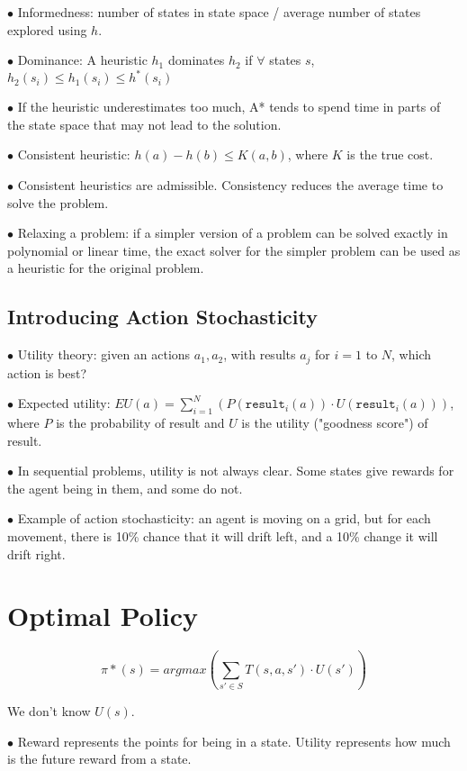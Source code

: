 \documentclass[english,openany]{book}
\begin{document}
    $\bullet$ Informedness: number of states in state space / average number of states explored using $h$.

    $\bullet$ Dominance: A heuristic $h_1$ dominates $h_2$ if $\forall$ states $s$, $h_2 (s_i) \leq h_1(s_i) \leq h^*(s_i)$

    $\bullet$ If the heuristic underestimates too much, A* tends to spend time in parts of the state space that may not lead to the solution.

    $\bullet$ Consistent heuristic: $h(a) - h(b) \leq K(a,b)$, where $K$ is the true cost.

    $\bullet$ Consistent heuristics are admissible. Consistency reduces the average time to solve the problem.

    $\bullet$ Relaxing a problem: if a simpler version of a problem can be solved exactly in polynomial or linear time, the exact solver for the simpler problem can be used as a heuristic for the original problem.

    \subsection{Introducing Action Stochasticity}

    $\bullet$ Utility theory: given an actions $a_1, a_2$, with results $a_j$ for $i = 1$ to $N$, which action is best?

    $\bullet$ Expected utility: $EU(a) = \sum_{i=1}^{N} (P(\texttt{result}_i (a)) \cdot U(\texttt{result}_i (a)))$, where $P$ is the probability of result and $U$ is the utility ("goodness score") of result.

    $\bullet$ In sequential problems, utility is not always clear. Some states give rewards for the agent being in them, and some do not.

    $\bullet$ Example of action stochasticity: an agent is moving on a grid, but for each movement, there is 10\% chance that it will drift left, and a 10\% change it will drift right.


    \section{Optimal Policy}

    $$\pi*(s) = argmax(\sum_{s' \in S} T(s, a, s') \cdot U(s'))$$

    We don't know $U(s)$.

    $\bullet$ Reward represents the points for being in a state. Utility represents how much is the future reward from a state.
\end{document}
